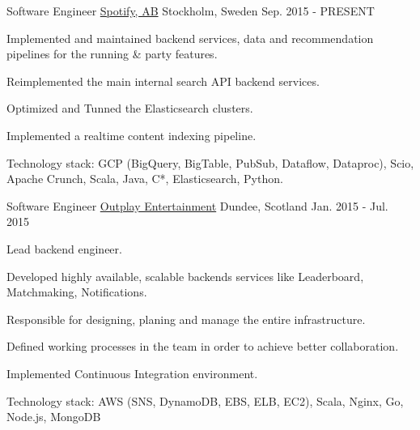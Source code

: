 

\begin{cventries}

  \cventry
    {Software Engineer} %
    {\href{https://spotify.com}{Spotify, AB}} %
    {Stockholm, Sweden} %
    {Sep. 2015 - PRESENT} %
    {
      \begin{cvitems} %
        \item {Implemented and maintained backend services, data and recommendation pipelines for the running \& party features.}
        \item {Reimplemented the main internal search API backend services.}
        \item {Optimized and Tunned the Elasticsearch clusters.}
        \item {Implemented a realtime content indexing pipeline.}
        \item {Technology stack: GCP (BigQuery, BigTable, PubSub, Dataflow, Dataproc), Scio, Apache Crunch, Scala, Java, C*, Elasticsearch, Python.}
      \end{cvitems}
    }

  \cventry
    {Software Engineer} %
    {\href{https://outplay.com}{Outplay Entertainment}} %
    {Dundee, Scotland} %
    {Jan. 2015 - Jul. 2015} %
    {
      \begin{cvitems} %
        \item {Lead backend engineer.}
        \item {Developed highly available, scalable backends services like Leaderboard, Matchmaking, Notifications.}
        \item {Responsible for designing, planing and manage the entire infrastructure.}
        \item {Defined working processes in the team in order to achieve better collaboration.}
        \item {Implemented Continuous Integration environment.}
        \item {Technology stack: AWS (SNS, DynamoDB, EBS, ELB, EC2), Scala, Nginx, Go, Node.js, MongoDB}
      \end{cvitems}
    }


\end{cventries}
